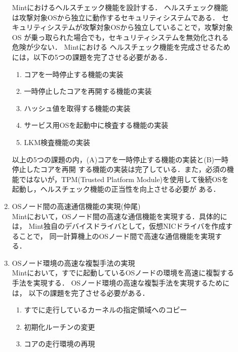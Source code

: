 \documentclass[12pt]{jsarticle}
\begin{document}
\begin{description}
\begin{enumerate}
                Mintにおけるヘルスチェック機能を設計する．
                ヘルスチェック機能は攻撃対象OSから独立に動作するセキュリティシステムである．
                セキュリティシステムが攻撃対象OSから独立していることで，攻撃対象OS
                が乗っ取られた場合でも，セキュリティシステムを無効化される危険が少ない．
                Mintにおける
                ヘルスチェック機能を完成させるためには，以下の5つの課題を完了させる必要がある．
                \begin{enumerate}
                    \item コアを一時停止する機能の実装
                    \item 一時停止したコアを再開する機能の実装
                    \item ハッシュ値を取得する機能の実装
                    \item サービス用OSを起動中に検査する機能の実装
                    \item LKM検査機能の実装
                \end{enumerate}
                以上の5つの課題の内，(A)コアを一時停止する機能の実装と(B)一時停止したコアを再開
                する機能の実装は完了している．また，必須の機能ではないが，TPM(Trusted Platform
                Module)を使用して後続OSを起動し，ヘルスチェック機能の正当性を向上させる必要が
                ある．
            \item OSノード間の高速通信機能の実現(仲尾)\\
                Mintにおいて，OSノード間の高速な通信機能を実現する．具体的には，
                Mint独自のデバイスドライバとして，仮想NICドライバを作成することで，
                同一計算機上のOSノード間で高速な通信機能を実現する．
            \item OSノード環境の高速な複製手法の実現\\
                Mintにおいて，すでに起動しているOSノードの環境を高速に複製する手法を実現する．
                OSノード環境の高速な複製手法を実現するためには，
                以下の課題を完了させる必要がある．
                \begin{enumerate}
                    \item すでに走行しているカーネルの指定領域へのコピー
                    \item 初期化ルーチンの変更
                    \item コアの走行環境の再現
                \end{enumerate}


\end{enumerate}
\end{description}
\end{document}
